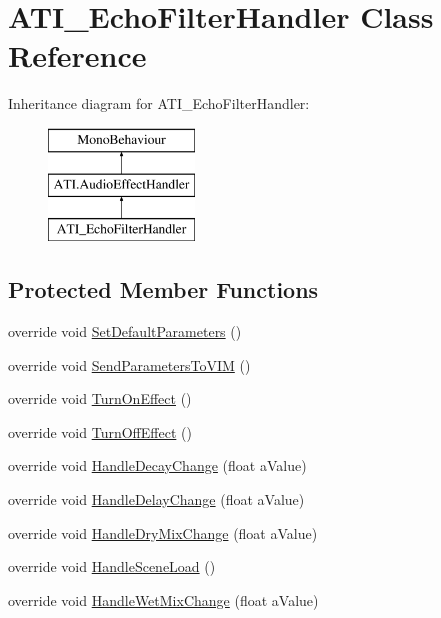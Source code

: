\hypertarget{class_a_t_i___echo_filter_handler}{}\section{A\+T\+I\+\_\+\+Echo\+Filter\+Handler Class Reference}
\label{class_a_t_i___echo_filter_handler}
Inheritance diagram for A\+T\+I\+\_\+\+Echo\+Filter\+Handler\+:\begin{figure}[H]
\begin{center}
\leavevmode
\includegraphics[height=3.000000cm]{class_a_t_i___echo_filter_handler}
\end{center}
\end{figure}
\subsection*{Protected Member Functions}
\begin{DoxyCompactItemize}
\item 
override void \hyperlink{class_a_t_i___echo_filter_handler_a55aed0339fe1f3cdbea2b810a2d74cd4}{Set\+Default\+Parameters} ()
\item 
override void \hyperlink{class_a_t_i___echo_filter_handler_afacef95c6ac470707d2bd092031efac0}{Send\+Parameters\+To\+V\+IM} ()
\item 
override void \hyperlink{class_a_t_i___echo_filter_handler_af759b786ad6e701f816264fefdddb078}{Turn\+On\+Effect} ()
\item 
override void \hyperlink{class_a_t_i___echo_filter_handler_aefc1d2ab19273b9606c09eff2db13165}{Turn\+Off\+Effect} ()
\item 
override void \hyperlink{class_a_t_i___echo_filter_handler_a280746246e42f85d36f96640a7148705}{Handle\+Decay\+Change} (float a\+Value)
\item 
override void \hyperlink{class_a_t_i___echo_filter_handler_a33447b03218ff2945e5f8cea0f8f0d45}{Handle\+Delay\+Change} (float a\+Value)
\item 
override void \hyperlink{class_a_t_i___echo_filter_handler_afc69af9ea7789eb655c01c851594716a}{Handle\+Dry\+Mix\+Change} (float a\+Value)
\item 
override void \hyperlink{class_a_t_i___echo_filter_handler_aef6df1fd85fb153d232191f1bd4de5f3}{Handle\+Scene\+Load} ()
\item 
override void \hyperlink{class_a_t_i___echo_filter_handler_ab64eed11cb12db663a9485bc4bc26fb9}{Handle\+Wet\+Mix\+Change} (float a\+Value)
\end{DoxyCompactItemize}
